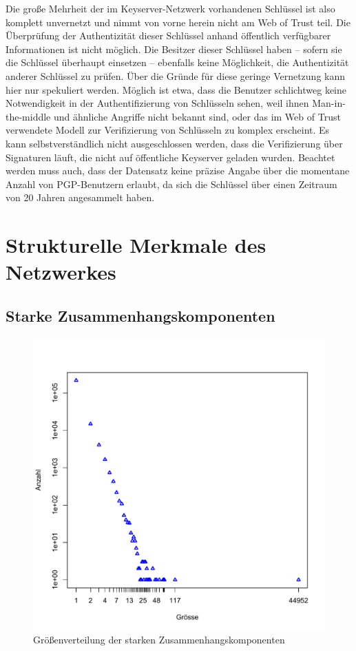 Die große Mehrheit der im Keyserver-Netzwerk vorhandenen Schlüssel
ist also komplett unvernetzt und nimmt von vorne herein nicht am Web of
Trust teil. Die Überprüfung der Authentizität dieser Schlüssel
anhand öffentlich verfügbarer Informationen ist nicht
möglich. Die Besitzer dieser Schlüssel haben -- sofern sie die
Schlüssel überhaupt einsetzen -- ebenfalls keine Möglichkeit,
die Authentizität anderer Schlüssel zu prüfen. Über die
Gründe für diese geringe Vernetzung kann hier nur spekuliert
werden. Möglich ist etwa, dass die Benutzer schlichtweg keine
Notwendigkeit in der Authentifizierung von Schlüsseln sehen, weil
ihnen Man-in-the-middle und ähnliche Angriffe nicht bekannt sind,
oder das im Web of Trust verwendete Modell zur Verifizierung von
Schlüsseln zu komplex erscheint. Es kann selbstverständlich nicht
ausgeschlossen werden, dass die Verifizierung über Signaturen
läuft, die nicht auf öffentliche Keyserver geladen
wurden. Beachtet werden muss auch, dass der Datensatz keine präzise
Angabe über die momentane Anzahl von PGP-Benutzern erlaubt, da sich
die Schlüssel über einen Zeitraum von 20 Jahren angesammelt haben.

\section{Strukturelle Merkmale des Netzwerkes}
\label{sec:result-allg-merkm-des}

\subsection{Starke Zusammenhangskomponenten}
\label{sec:result-komponentenstruktur}

\begin{figure}[t]
  \centering
  \includegraphics[scale=0.42]{images/component-size.pdf}
  \caption{Größenverteilung der starken Zusammenhangskomponenten}
  \label{fig:component-size}
\end{figure}

